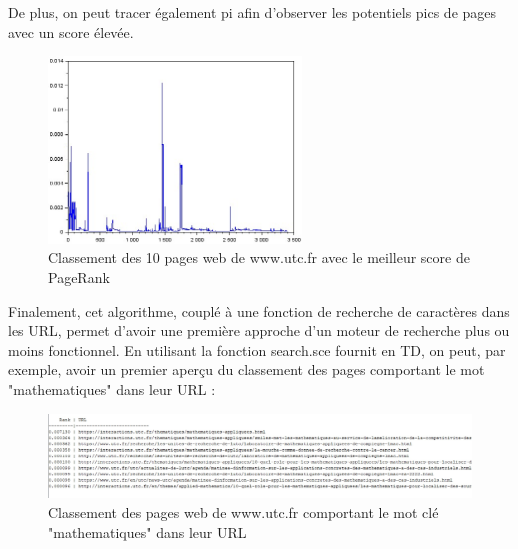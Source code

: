             De plus, on peut tracer également pi afin d'observer les potentiels pics de pages avec un score élevée.
            \begin{figure}[H]
              \centering
                \includegraphics[width=0.6\textwidth]{images/pi.jpg}
              \caption{Classement des 10 pages web de www.utc.fr avec le meilleur score de PageRank}
              \label{fig:gr3}
            \end{figure}
            Finalement, cet algorithme, couplé à une fonction de recherche de caractères dans les URL, permet d'avoir une première approche d'un moteur de recherche plus ou moins fonctionnel. En utilisant la fonction search.sce fournit en TD, on peut, par exemple, avoir un premier aperçu du classement des pages comportant le mot "mathematiques" dans leur URL :
            \begin{figure}[H]
              \centering
                \includegraphics[width=1\textwidth]{images/classement2.jpg}
              \caption{Classement des pages web de www.utc.fr comportant le mot clé "mathematiques" dans leur URL}
              \label{fig:gr4}
            \end{figure}
   \newpage
